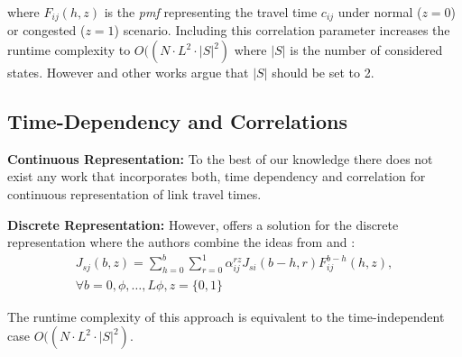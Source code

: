where $F_{ij}(h,z)$ is the \textit{pmf} representing the travel time $c_{ij}$ under
normal ($z=0$) or congested ($z=1$) scenario. Including this correlation
parameter increases the runtime complexity to $O((N \cdot L^2 \cdot |S|^2)$
where $|S|$ is the number of considered states. However \cite{NieFan06} and
other works argue that $|S|$ should be set to 2.

\subsection{Time-Dependency and Correlations}
\label{subsec:timcor}
\vspace{0.2cm}

\textbf{Continuous Representation: } To the best of our knowledge there does not
exist any work that incorporates both, time dependency and correlation for
continuous representation of link travel times.

\textbf{Discrete Representation: } However, \cite{NieWu09a} offers a solution
for the discrete representation  where the authors combine the ideas from \cite{NieWu09} and
\cite{NieFan06}:
\begin{multline}
\label{eq:pmr4}
	J_{sj}(b,z) = \sum_{h=0}^b \sum_{r=0}^1 \alpha^{rz}_{ij} J_{si}(b-h,r)
	F_{ij}^{b-h}(h,z)  , \\ \forall b = 0, \phi,\ldots, L
	\phi, z = \{0, 1\}
\end{multline}

The runtime complexity of this approach is equivalent to the time-independent
case $O((N \cdot L^2 \cdot |S|^2)$.
